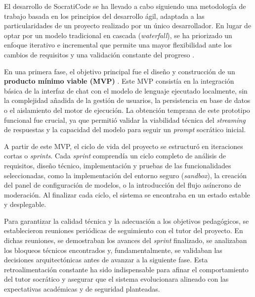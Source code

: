 El desarrollo de SocratiCode se ha llevado a cabo siguiendo una metodología de trabajo basada en los principios del desarrollo ágil, adaptada a las particularidades de un proyecto realizado por un único desarrollador. En lugar de optar por un modelo tradicional en cascada (\textit{waterfall}), se ha priorizado un enfoque iterativo e incremental que permite una mayor flexibilidad ante los cambios de requisitos y una validación constante del progreso \cite{larman2003iterative}.

En una primera fase, el objetivo principal fue el diseño y construcción de un \textbf{producto mínimo viable (MVP)} \cite{hokkanen2016mvp}. Este MVP consistía en la integración básica de la interfaz de chat con el modelo de lenguaje ejecutado localmente, sin la complejidad añadida de la gestión de usuarios, la persistencia en base de datos o el aislamiento del motor de ejecución. La obtención temprana de este prototipo funcional fue crucial, ya que permitió validar la viabilidad técnica del \textit{streaming} de respuestas y la capacidad del modelo para seguir un \textit{prompt} socrático inicial.

A partir de este MVP, el ciclo de vida del proyecto se estructuró en iteraciones cortas o \textit{sprints}. Cada \textit{sprint} comprendía un ciclo completo de análisis de requisitos, diseño técnico, implementación y pruebas de las funcionalidades seleccionadas, como la implementación del entorno seguro (\textit{sandbox}), la creación del panel de configuración de modelos, o la introducción del flujo asíncrono de moderación. Al finalizar cada ciclo, el sistema se encontraba en un estado estable y desplegable.

Para garantizar la calidad técnica y la adecuación a los objetivos pedagógicos, se establecieron reuniones periódicas de seguimiento con el tutor del proyecto. En dichas reuniones, se demostraban los avances del \textit{sprint} finalizado, se analizaban los bloqueos técnicos encontrados y, fundamentalmente, se validaban las decisiones arquitectónicas antes de avanzar a la siguiente fase. Esta retroalimentación constante ha sido indispensable para afinar el comportamiento del tutor socrático y asegurar que el sistema evolucionara alineado con las expectativas académicas y de seguridad planteadas.